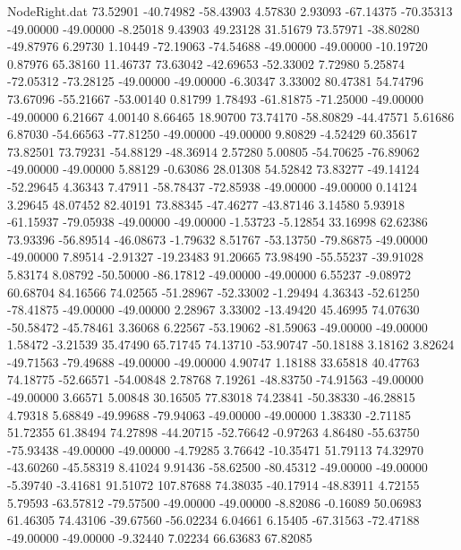 \begin{filecontents}{NodeRight.dat}
  73.52901  -40.74982  -58.43903     4.57830    2.93093  -67.14375  -70.35313  -49.00000  -49.00000   -8.25018    9.43903   49.23128   31.51679
  73.57971  -38.80280  -49.87976     6.29730    1.10449  -72.19063  -74.54688  -49.00000  -49.00000  -10.19720    0.87976   65.38160   11.46737
  73.63042  -42.69653  -52.33002     7.72980    5.25874  -72.05312  -73.28125  -49.00000  -49.00000   -6.30347    3.33002   80.47381   54.74796
  73.67096  -55.21667  -53.00140     0.81799    1.78493  -61.81875  -71.25000  -49.00000  -49.00000    6.21667    4.00140    8.66465   18.90700
  73.74170  -58.80829  -44.47571     5.61686    6.87030  -54.66563  -77.81250  -49.00000  -49.00000    9.80829   -4.52429   60.35617   73.82501
  73.79231  -54.88129  -48.36914     2.57280    5.00805  -54.70625  -76.89062  -49.00000  -49.00000    5.88129   -0.63086   28.01308   54.52842
  73.83277  -49.14124  -52.29645     4.36343    7.47911  -58.78437  -72.85938  -49.00000  -49.00000    0.14124    3.29645   48.07452   82.40191
  73.88345  -47.46277  -43.87146     3.14580    5.93918  -61.15937  -79.05938  -49.00000  -49.00000   -1.53723   -5.12854   33.16998   62.62386
  73.93396  -56.89514  -46.08673    -1.79632    8.51767  -53.13750  -79.86875  -49.00000  -49.00000    7.89514   -2.91327  -19.23483   91.20665
  73.98490  -55.55237  -39.91028     5.83174    8.08792  -50.50000  -86.17812  -49.00000  -49.00000    6.55237   -9.08972   60.68704   84.16566
  74.02565  -51.28967  -52.33002    -1.29494    4.36343  -52.61250  -78.41875  -49.00000  -49.00000    2.28967    3.33002  -13.49420   45.46995
  74.07630  -50.58472  -45.78461     3.36068    6.22567  -53.19062  -81.59063  -49.00000  -49.00000    1.58472   -3.21539   35.47490   65.71745
  74.13710  -53.90747  -50.18188     3.18162    3.82624  -49.71563  -79.49688  -49.00000  -49.00000    4.90747    1.18188   33.65818   40.47763
  74.18775  -52.66571  -54.00848     2.78768    7.19261  -48.83750  -74.91563  -49.00000  -49.00000    3.66571    5.00848   30.16505   77.83018
  74.23841  -50.38330  -46.28815     4.79318    5.68849  -49.99688  -79.94063  -49.00000  -49.00000    1.38330   -2.71185   51.72355   61.38494
  74.27898  -44.20715  -52.76642    -0.97263    4.86480  -55.63750  -75.93438  -49.00000  -49.00000   -4.79285    3.76642  -10.35471   51.79113
  74.32970  -43.60260  -45.58319     8.41024    9.91436  -58.62500  -80.45312  -49.00000  -49.00000   -5.39740   -3.41681   91.51072  107.87688
  74.38035  -40.17914  -48.83911     4.72155    5.79593  -63.57812  -79.57500  -49.00000  -49.00000   -8.82086   -0.16089   50.06983   61.46305
  74.43106  -39.67560  -56.02234     6.04661    6.15405  -67.31563  -72.47188  -49.00000  -49.00000   -9.32440    7.02234   66.63683   67.82085

\end{filecontents}
